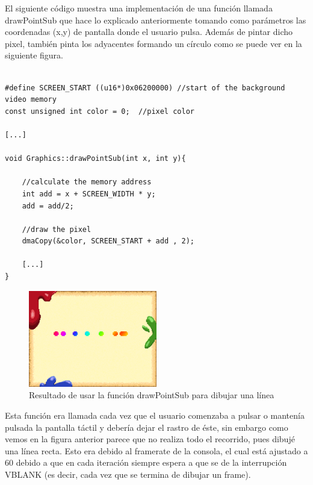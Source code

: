 \vspace{0.5cm}

El siguiente código muestra una implementación de una función llamada drawPointSub que hace lo explicado anteriormente tomando como parámetros las coordenadas (x,y) de pantalla donde el usuario pulsa. Además de pintar dicho pixel, también pinta los adyacentes formando un círculo como se puede ver en la siguiente figura.

\vspace{0.5cm}

\begin{lstlisting}[caption={Función de dibujado de pixeles dada una entrada de usuario}, label={code:drawPointSub}]

#define SCREEN_START ((u16*)0x06200000) //start of the background video memory
const unsigned int color = 0;  //pixel color

[...]

void Graphics::drawPointSub(int x, int y){

    //calculate the memory address
    int add = x + SCREEN_WIDTH * y;
    add = add/2;

    //draw the pixel
    dmaCopy(&color, SCREEN_START + add , 2);
    
    [...]
}

\end{lstlisting}

\vspace{0.5cm}

\begin{figure}[htbp]
\centering
  \includegraphics[width=0.5\textwidth]{archivos/sub_draw_no_bresenham.png}
  \caption{Resultado de usar la función drawPointSub para dibujar una línea}
  \label{fig:sub_draw_no_bresenham}
\end{figure}

\vspace{0.5cm}

Esta función era llamada cada vez que el usuario comenzaba a pulsar o mantenía pulsada la pantalla táctil y debería dejar el rastro de éste, sin embargo como vemos en la figura anterior parece que no realiza todo el recorrido, pues dibujé una línea recta. Esto era debido al framerate de la consola, el cual está ajustado a 60 debido a que en cada iteración siempre espera a que se de la interrupción  VBLANK (es decir, cada vez que se termina de dibujar un frame).

